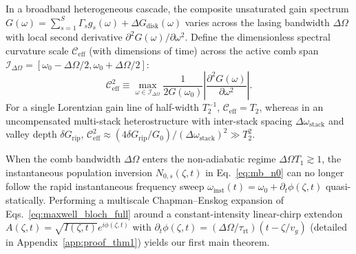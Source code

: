 \documentclass[11pt,letterpaper]{article}
\begin{document}
In a broadband heterogeneous cascade, the composite unsaturated gain spectrum $G(\omega) = \sum_{s=1}^S \Gamma_s g_s(\omega) + \Delta G_{\mathrm{disk}}(\omega)$ varies across the lasing bandwidth $\Delta\Omega$ with local second derivative $\partial^2 G(\omega)/\partial\omega^2$. Define the dimensionless spectral curvature scale $\mathcal{C}_{\mathrm{eff}}$ (with dimensions of time) across the active comb span $\mathcal{I}_{\Delta\Omega} = [\omega_0 - \Delta\Omega/2, \omega_0 + \Delta\Omega/2]$:
\begin{equation}
\mathcal{C}_{\mathrm{eff}}^2 \equiv \max_{\omega \in \mathcal{I}_{\Delta\Omega}} \frac{1}{2 G(\omega_0)}\left|\frac{\partial^2 G(\omega)}{\partial\omega^2}\right|.
\label{eq:c_eff_def}
\end{equation}
For a single Lorentzian gain line of half-width $T_2^{-1}$, $\mathcal{C}_{\mathrm{eff}} = T_2$, whereas in an uncompensated multi-stack heterostructure with inter-stack spacing $\Delta\omega_{\mathrm{stack}}$ and valley depth $\delta G_{\mathrm{rip}}$, $\mathcal{C}_{\mathrm{eff}}^2 \approx (4\delta G_{\mathrm{rip}}/G_0)/(\Delta\omega_{\mathrm{stack}})^2 \gg T_2^2$.

When the comb bandwidth $\Delta\Omega$ enters the non-adiabatic regime $\Delta\Omega T_1 \gtrsim 1$, the instantaneous population inversion $N_{0,s}(\zeta, t)$ in Eq.~\eqref{eq:mb_n0} can no longer follow the rapid instantaneous frequency sweep $\omega_{\mathrm{inst}}(t) = \omega_0 + \partial_t \phi(\zeta, t)$ quasi-statically. Performing a multiscale Chapman--Enskog expansion of Eqs.~\eqref{eq:maxwell_bloch_full} around a constant-intensity linear-chirp extendon $A(\zeta, t) = \sqrt{I(\zeta, t)}e^{i\phi(\zeta, t)}$ with $\partial_t \phi(\zeta, t) = (\Delta\Omega/\tau_{\mathrm{rt}})(t - \zeta/v_g)$ (detailed in Appendix~\ref{app:proof_thm1}) yields our first main theorem.
\end{document}
